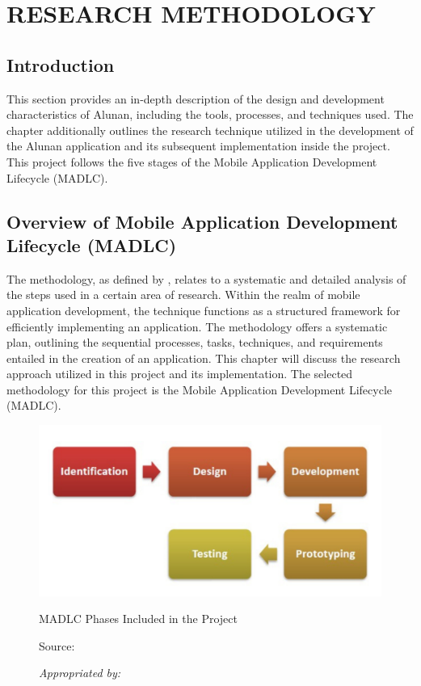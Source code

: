 \chapter{RESEARCH METHODOLOGY}
\label{ch:method}

\section{Introduction}
This section provides an in-depth description of the design and development characteristics of Alunan, including the tools, processes, and techniques used. The chapter additionally outlines the research technique utilized in the development of the Alunan application and its subsequent implementation inside the project. This project follows the five stages of the Mobile Application Development Lifecycle (MADLC).

\section{Overview of Mobile Application Development Lifecycle (MADLC)}
The methodology, as defined by \textcite{igwenagu16}, relates to a systematic and detailed analysis of the steps used in a certain area of research. Within the realm of mobile application development, the technique functions as a structured framework for efficiently implementing an application. The methodology offers a systematic plan, outlining the sequential processes, tasks, techniques, and requirements entailed in the creation of an application. This chapter will discuss the research approach utilized in this project and its implementation. The selected methodology for this project is the Mobile Application Development Lifecycle (MADLC).

\begin{figure}[h]
    \centering
    \includegraphics[width=0.8\linewidth]{mainmatter/images/madlc1.png}
    \caption{MADLC Phases Included in the Project}
    \caption*{Source: \textcite{moharekar21}}
    \caption*{\textit{Appropriated by: \textcite{shanmugam19}}}
    \label{fig:myfig29}
\end{figure}

